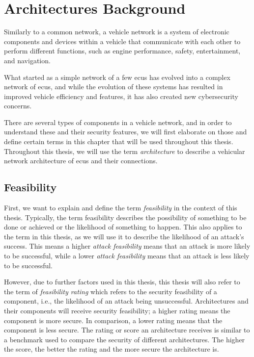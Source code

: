 \chapter{Architectures Background}
\label{chp:arch}

Similarly to a common network, a vehicle network is a system of electronic components and devices within a vehicle 
that communicate with each other to perform different functions, such as engine performance, safety, entertainment, and navigation. 

What started as a simple network of a few \acrshort{ecu}s has evolved into a complex network of \acrshort{ecu}s,
and while the evolution of these systems has resulted in improved vehicle efficiency and features, 
it has also created new cybersecurity concerns.

There are several types of components in a vehicle network, and in order to understand these and their security features,
we will first elaborate on those and define certain terms in this chapter that will be used throughout this thesis.
Throughout this thesis, we will use the term \textit{architecture} to describe a vehicular network architecture of \acrshort{ecu}s and their connections.

\section{Feasibility}
\label{def:feasibility}

First, we want to explain and define the term \textit{feasibility} in the context of this thesis.
Typically, the term feasibility describes the possibility of something to be done or achieved or the likelihood of something to happen.
This also applies to the term in this thesis, as we will use it to describe the likelihood of an attack's success.
This means a higher \textit{attack feasibility} means that an attack is more likely to be successful, while a lower \textit{attack feasibility} means that an attack is less likely to be successful.

However, due to further factors used in this thesis, this thesis will also refer to the term of \textit{feasibility rating}
which refers to the security feasibility of a component, i.e., the likelihood of an attack being unsuccessful.
Architectures and their components will receive security feasibility; a higher rating means the component is more secure. 
In comparison, a lower rating means that the component is less secure.
The rating or score an architecture receives is similar to a benchmark used to compare the security of different architectures.
The higher the score, the better the rating and the more secure the architecture is.

